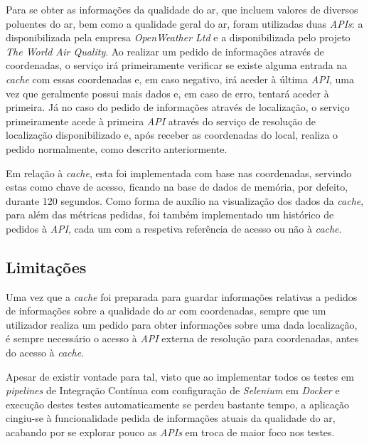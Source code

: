 \documentclass[10pt,english]{article}
\begin{document}
\par Para se obter as informações da qualidade do ar, que incluem valores de diversos poluentes do ar, bem como a qualidade geral do ar, foram utilizadas duas \textit{APIs}: a disponibilizada pela empresa \textit{OpenWeather Ltd} e a disponibilizada pelo projeto \textit{The World Air Quality}. Ao realizar um pedido de informações através de coordenadas, o serviço irá primeiramente verificar se existe alguma entrada na \textit{cache} com essas coordenadas e, em caso negativo, irá aceder à última \textit{API}, uma vez que geralmente possui mais dados e, em caso de erro, tentará aceder à primeira. Já no caso do pedido de informações através de localização, o serviço primeiramente acede à primeira \textit{API} através do serviço de resolução de localização disponibilizado e, após receber as coordenadas do local, realiza o pedido normalmente, como descrito anteriormente.

\par Em relação à \textit{cache}, esta foi implementada com base nas coordenadas, servindo estas como chave de acesso, ficando na base de dados de memória, por defeito, durante 120 segundos. Como forma de auxílio na visualização dos dados da \textit{cache}, para além das métricas pedidas, foi também implementado um histórico de pedidos à \textit{API}, cada um com a respetiva referência de acesso ou não à \textit{cache}.

\subsection{Limitações}

\par Uma vez que a \textit{cache} foi preparada para guardar informações relativas a pedidos de informações sobre a qualidade do ar com coordenadas, sempre que um utilizador realiza um pedido para obter informações sobre uma dada localização, é sempre necessário o acesso à \textit{API} externa de resolução para coordenadas, antes do acesso à \textit{cache}. 

\par Apesar de existir vontade para tal, visto que ao implementar todos os testes em \textit{pipelines} de Integração Contínua com configuração de \textit{Selenium} em \textit{Docker} e execução destes testes automaticamente se perdeu bastante tempo, a aplicação cingiu-se à funcionalidade pedida de informações atuais da qualidade do ar, acabando por se explorar pouco as \textit{APIs} em troca de maior foco nos testes.
\end{document}
